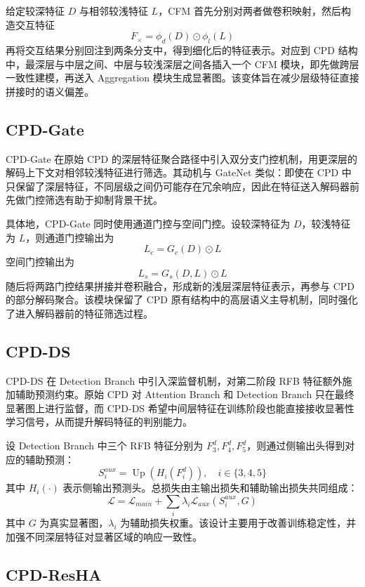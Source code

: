 \documentclass[UTF8,a4paper,10pt]{ctexart}
\begin{document}
给定较深特征 \(D\) 与相邻较浅特征 \(L\)，CFM 首先分别对两者做卷积映射，然后构造交互特征
\[
F_{\times} = \phi_d(D) \odot \phi_l(L)
\]
再将交互结果分别回注到两条分支中，得到细化后的特征表示。对应到 CPD 结构中，最深层与中层之间、中层与较浅深层之间各插入一个 CFM 模块，即先做跨层一致性建模，再送入 Aggregation 模块生成显著图。该变体旨在减少层级特征直接拼接时的语义偏差。

\subsection{CPD-Gate}

CPD-Gate 在原始 CPD 的深层特征聚合路径中引入双分支门控机制，用更深层的解码上下文对相邻较浅特征进行筛选。其动机与 GateNet 类似：即使在 CPD 中只保留了深层特征，不同层级之间仍可能存在冗余响应，因此在特征送入解码器前先做门控筛选有助于抑制背景干扰。

具体地，CPD-Gate 同时使用通道门控与空间门控。设较深特征为 \(D\)，较浅特征为 \(L\)，则通道门控输出为
\[
L_c = G_c(D) \odot L
\]
空间门控输出为
\[
L_s = G_s(D, L) \odot L
\]
随后将两路门控结果拼接并卷积融合，形成新的浅层深层特征表示，再参与 CPD 的部分解码聚合。该模块保留了 CPD 原有结构中的高层语义主导机制，同时强化了进入解码器前的特征筛选过程。

\subsection{CPD-DS}

CPD-DS 在 Detection Branch 中引入深监督机制，对第二阶段 RFB 特征额外施加辅助预测约束。原始 CPD 对 Attention Branch 和 Detection Branch 只在最终显著图上进行监督，而 CPD-DS 希望中间层特征在训练阶段也能直接接收显著性学习信号，从而提升解码特征的判别能力。

设 Detection Branch 中三个 RFB 特征分别为 \(F_3^d,F_4^d,F_5^d\)，则通过侧输出头得到对应的辅助预测：
\[
S_i^{aux} = \operatorname{Up}(H_i(F_i^d)), \quad i \in \{3,4,5\}
\]
其中 \(H_i(\cdot)\) 表示侧输出预测头。总损失由主输出损失和辅助输出损失共同组成：
\[
\mathcal{L}
=
\mathcal{L}_{main}
+
\sum_i \lambda_i \mathcal{L}_{aux}(S_i^{aux}, G)
\]
其中 \(G\) 为真实显著图，\(\lambda_i\) 为辅助损失权重。该设计主要用于改善训练稳定性，并加强不同深层特征对显著区域的响应一致性。

\subsection{CPD-ResHA}
\end{document}
